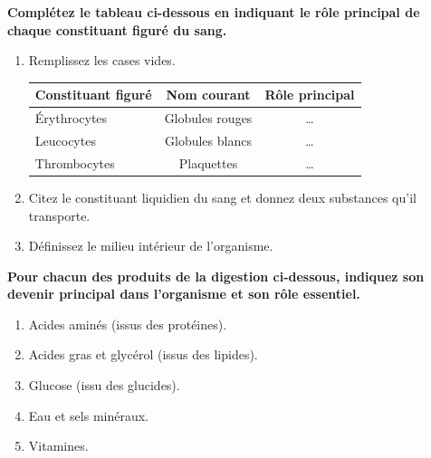 \documentclass[11pt]{article}
\begin{document}
\begin{exercice}
\textbf{Complétez le tableau ci-dessous en indiquant le rôle principal de chaque constituant figuré du sang.}
\begin{enumerate}
    \item Remplissez les cases vides.
    \begin{center}
    \begin{tabular}{|l|c|c|}
    \hline
    \textbf{Constituant figuré} & \textbf{Nom courant} & \textbf{Rôle principal} \\
    \hline
    Érythrocytes & Globules rouges & \ldots \\
    \hline
    Leucocytes & Globules blancs & \ldots \\
    \hline
    Thrombocytes & Plaquettes & \ldots \\
    \hline
    \end{tabular}
    \end{center}
    \item Citez le constituant liquidien du sang et donnez deux substances qu'il transporte.
    \item Définissez le \og milieu intérieur \fg{} de l'organisme.
\end{enumerate}
\end{exercice}

\begin{exercice}
\textbf{Pour chacun des produits de la digestion ci-dessous, indiquez son devenir principal dans l'organisme et son rôle essentiel.}
\begin{enumerate}
    \item Acides aminés (issus des protéines).
    \item Acides gras et glycérol (issus des lipides).
    \item Glucose (issu des glucides).
    \item Eau et sels minéraux.
    \item Vitamines.
\end{enumerate}
\end{exercice}
\end{document}
